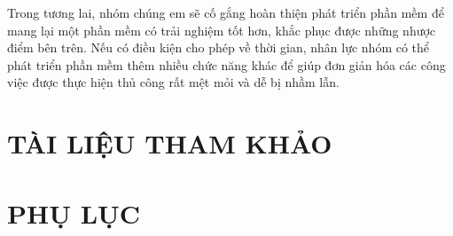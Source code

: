 \documentclass{article}
\begin{document}
Trong tương lai, nhóm chúng em sẽ cố gắng hoàn thiện phát triển phần mềm để mang lại một phần mềm có trải nghiệm tốt hơn, khắc phục được những nhược điểm bên trên. Nếu có điều kiện cho phép về thời gian, nhân lực nhóm có thể phát triển phần mềm thêm nhiều chức năng khác để giúp đơn giản hóa các công việc được thực hiện thủ công rất mệt mỏi và dễ bị nhầm lẫn.
\newpage

\section*{TÀI LIỆU THAM KHẢO}
\newpage

\section*{PHỤ LỤC}
\end{document}
